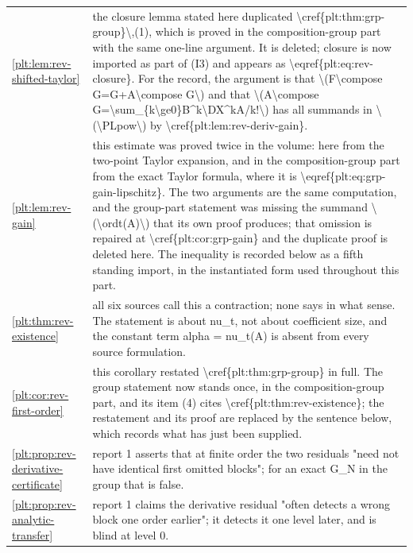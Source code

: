\documentclass[11pt,oneside]{article}
\theoremstyle{plain}
\theoremstyle{definition}
\theoremstyle{remark}
\begin{document}
\begin{longtable}{@{}p{} p{}@{}}
\cref{plt:lem:rev-shifted-taylor} & the closure lemma stated here duplicated \textbackslash cref\{plt:thm:grp-group\}\textbackslash ,(1), which is proved in the composition-group part with the same one-line argument. It is deleted; closure is now imported as part of (I3) and appears as \textbackslash eqref\{plt:eq:rev-closure\}. For the record, the argument is that \textbackslash (F\textbackslash compose G=G+A\textbackslash compose G\textbackslash ) and that \textbackslash (A\textbackslash compose G=\textbackslash sum\_\{k\textbackslash ge0\}B\textasciicircum k\textbackslash DX\textasciicircum kA/k!\textbackslash ) has all summands in \textbackslash (\textbackslash PLpow\textbackslash ) by \textbackslash cref\{plt:lem:rev-deriv-gain\}.\\
\cref{plt:lem:rev-gain} & this estimate was proved twice in the volume: here from the two-point Taylor expansion, and in the composition-group part from the exact Taylor formula, where it is \textbackslash eqref\{plt:eq:grp-gain-lipschitz\}. The two arguments are the same computation, and the group-part statement was missing the summand \textbackslash (\textbackslash ordt(A)\textbackslash ) that its own proof produces; that omission is repaired at \textbackslash cref\{plt:cor:grp-gain\} and the duplicate proof is deleted here. The inequality is recorded below as a fifth standing import, in the instantiated form used throughout this part.\\
\cref{plt:thm:rev-existence} & all six sources call this a contraction; none says in what sense. The statement is about nu\_t, not about coefficient size, and the constant term alpha = nu\_t(A) is absent from every source formulation.\\
\cref{plt:cor:rev-first-order} & this corollary restated \textbackslash cref\{plt:thm:grp-group\} in full. The group statement now stands once, in the composition-group part, and its item (4) cites \textbackslash cref\{plt:thm:rev-existence\}; the restatement and its proof are replaced by the sentence below, which records what has just been supplied.\\
\cref{plt:prop:rev-derivative-certificate} & report 1 asserts that at finite order the two residuals "need not have identical first omitted blocks"; for an exact G\_N in the group that is false.\\
\cref{plt:prop:rev-analytic-transfer} & report 1 claims the derivative residual "often detects a wrong block one order earlier"; it detects it one level later, and is blind at level 0.\\

\end{longtable}
\end{document}
